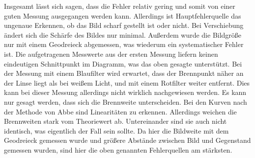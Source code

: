 \noindent Insgesamt lässt sich sagen, dass die Fehler relativ gering und somit von einer guten Messung ausgegangen werden kann. Allerdings ist Hauptfehlerquelle
das ungenaue Erkennen, ob das Bild scharf gestellt ist oder nicht. Bei Verschiebung ändert sich die Schärfe des Bildes nur minimal. Außerdem wurde
die Bildgröße nur mit einem Geodreieck abgemessen, was wiederum ein systematischer Fehler ist.
Die aufgetragenen Messwerte aus der ersten Messung liefern keinen eindeutigen Schnittpunkt im Diagramm, was das oben gesagte unterstützt.
Bei der Messung mit einem Blaufilter wird erwartet, dass der Brennpunkt näher an der Linse liegt als bei weißem Licht, und mit einem Rotfilter weiter entfernt. Dies kann bei dieser Messung allerdings nicht wirklich nachgewiesen werden. Es kann nur gesagt werden, dass sich die Brennweite unterscheiden.
Bei den Kurven nach der Methode von Abbe sind Linearitäten zu erkennen. Allerdings weichen die Brennweiten stark vom Theoriewert ab. Untereinander sind sie auch nicht identisch, was eigentlich der Fall sein sollte. Da hier die Bildweite mit dem Geodreieck gemessen wurde und größere Abstände zwischen Bild und Gegenstand gemessen wurden, sind hier die oben genannten Fehlerquellen am stärksten.

